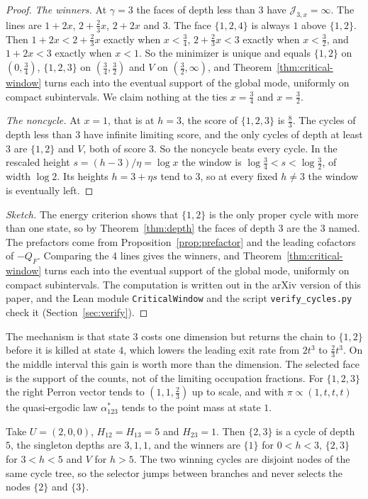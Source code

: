 \begin{proof}
\emph{The winners.} At $\gamma=3$ the faces of depth less than $3$ have
$\mathcal J_{3,x}=\infty$. The lines are $1+2x$, $2+\frac23x$, $2+2x$ and $3$. The face
$\{1,2,4\}$ is always $1$ above $\{1,2\}$. Then $1+2x<2+\frac23x$ exactly when
$x<\frac34$, $2+\frac23x<3$ exactly when $x<\frac32$, and $1+2x<3$ exactly
when $x<1$. So the minimizer is unique and equals $\{1,2\}$ on $(0,\frac34)$,
$\{1,2,3\}$ on $(\frac34,\frac32)$ and $V$ on $(\frac32,\infty)$, and
Theorem~\ref{thm:critical-window} turns each into the eventual support of the
global mode, uniformly on compact subintervals. We claim nothing at the ties
$x=\frac34$ and $x=\frac32$.

\emph{The noncycle.} At $x=1$, that is at $h=3$, the score of $\{1,2,3\}$ is
$\frac83$. The cycles of depth less than $3$ have infinite limiting score, and
the only cycles of depth at least $3$ are $\{1,2\}$ and $V$, both of score $3$.
So the noncycle beats every cycle. In the rescaled height $s=(h-3)/\eta=\log x$ the window is
$\log\frac34<s<\log\frac32$, of width $\log2$. Its heights $h=3+\eta s$ tend to
$3$, so at every fixed $h\ne3$ the window is eventually left.
\end{proof}
\else
\begin{proof}[Sketch]
The energy criterion shows that $\{1,2\}$ is the only proper cycle with more than one state, so
by Theorem~\ref{thm:depth} the faces of depth $3$ are the 3 named. The prefactors come from
Proposition~\ref{prop:prefactor} and the leading cofactors of $-Q_F$. Comparing the 4 lines gives
the winners, and Theorem~\ref{thm:critical-window} turns each into the eventual support of the
global mode, uniformly on compact subintervals. The computation is written out in the arXiv version
of this paper, and the Lean module \texttt{CriticalWindow} and the script \texttt{verify\_cycles.py}
check it (Section~\ref{sec:verify}).
\end{proof}
\fi

The mechanism is that state $3$ costs one dimension but returns the chain to
$\{1,2\}$ before it is killed at state $4$, which lowers the leading exit rate
from $2t^3$ to $\frac23t^3$. On the middle interval this gain is worth more
than the dimension. The selected face is the support of the counts, not of the
limiting occupation fractions. For $\{1,2,3\}$ the right Perron vector tends to
$(1,1,\frac23)$ up to scale, and with $\pi\propto(1,t,t,t)$ the quasi-ergodic
law $\alpha^*_{123}$ tends to the point mass at state $1$.

\begin{example}\label{ex:branch-switch}
Take $U=(2,0,0)$, $H_{12}=H_{13}=5$ and $H_{23}=1$. Then $\{2,3\}$ is a cycle
of depth $5$, the singleton depths are $3,1,1$, and the winners are $\{1\}$
for $0<h<3$, $\{2,3\}$ for $3<h<5$ and $V$ for $h>5$. The two winning cycles
are disjoint nodes of the same cycle tree, so the selector jumps between
branches and never selects the nodes $\{2\}$ and $\{3\}$.
\end{example}

